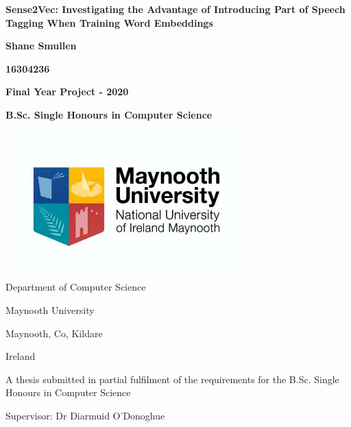 \documentclass[12pt]{report}
\begin{document}
\begin{titlepage}
   \begin{center}
       \vspace*{1cm}
       
       \textbf{Sense2Vec: Investigating the Advantage of Introducing Part of Speech Tagging When Training Word Embeddings}
       
       \vspace{1.5cm}
       
       \textbf{Shane Smullen}
       
       \textbf{16304236}
       
       \textbf{Final Year Project - 2020}
       
       \textbf{B.Sc. Single Honours in Computer Science}
        \vspace{1.5cm}
        
       \includegraphics[width=0.7\textwidth]{university.JPG}
        \vspace{1.0cm}
        
        Department of Computer Science
        
        Maynooth University
        
        Maynooth, Co, Kildare
        
        Ireland
        
        \vspace{0.5cm}
        A thesis submitted in partial fulfilment of the requirements for the B.Sc. Single Honours in Computer Science
       \vspace{0.8cm}
       
       Supervisor: Dr Diarmuid O'Donoghue

       \vspace{0.5cm}

   \end{center}

\end{titlepage}
\end{document}
